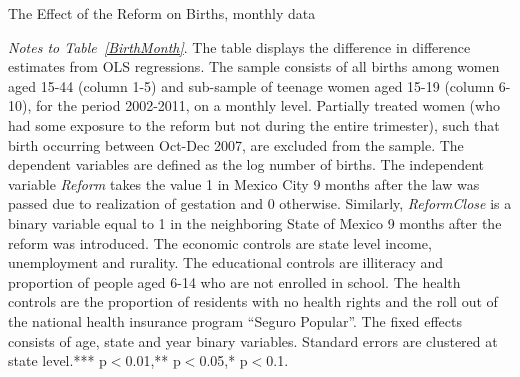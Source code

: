 \documentclass[a4paper, 11pt]{article}
\begin{document}
\begin{spacing}{1.4}
 

 

\begin{table}\caption{The Effect of the Reform on Births, monthly data} \label{BirthMonth}
	
	\begin{threeparttable}
		
		{\footnotesize  }
		
		\begin{tablenotes}
			
			\footnotesize
			
			\item \textit{Notes to Table~\ref{BirthMonth}}. The table displays the difference in difference estimates from OLS regressions. The sample consists of all births among women aged 15-44 (column 1-5) and sub-sample of teenage women aged 15-19 (column 6-10), for the period 2002-2011, on a monthly level. Partially treated women (who had some exposure to the reform but not during the entire trimester), such that birth occurring between Oct-Dec 2007, are excluded from the sample. The dependent variables are defined as the log number of births. The independent variable \textit{Reform} takes the value 1 in Mexico City 9 months after the law was passed due to realization of gestation and 0 otherwise. Similarly, \textit{ReformClose} is a binary variable equal to 1 in the neighboring State of Mexico 9 months after the reform was introduced. The economic controls are state level income, unemployment and rurality. The educational controls are illiteracy and proportion of people aged 6-14 who are not enrolled in school. The health controls are the proportion of residents with no health rights and the roll out of the national health insurance program ``Seguro Popular''. The fixed effects consists of age, state and year binary variables. Standard errors are clustered at state level.*** p$<$0.01,** p$<$0.05,* p$<$0.1.
			 
			
		\end{tablenotes} 
		
	\end{threeparttable}
	

\end{table}
\end{spacing}
\end{document}
